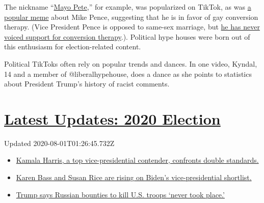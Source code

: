 The nickname
``\href{https://melmagazine.com/en-us/story/mayo-pete-memes-buttigieg-tiktok-teens}{Mayo
Pete},'' for example, was popularized on TikTok, as was
\href{https://melmagazine.com/en-us/story/camp-pence-tiktok-memes-lgbtq-conversion-therapy}{a
popular meme} about Mike Pence, suggesting that he is in favor of gay
conversion therapy. (Vice President Pence is opposed to same-sex
marriage, but
\href{https://www.nytimes.com/2016/11/30/us/politics/mike-pence-and-conversion-therapy-a-history.html}{he
has never voiced support for conversion therapy}.). Political hype
houses were born out of this enthusiasm for election-related content.

Political TikToks often rely on popular trends and dances. In one video,
Kyndal, 14 and a member of @liberalhypehouse, does a dance as she points
to statistics about President Trump's history of racist comments.

\hypertarget{latest-updates-2020-election}{%
\section{\texorpdfstring{\href{https://www.nytimes.com/2020/07/31/us/elections/biden-vs-trump.html?action=click\&pgtype=Article\&state=default\&region=MAIN_CONTENT_1\&context=storylines_live_updates}{Latest
Updates: 2020
Election}}{Latest Updates: 2020 Election}}\label{latest-updates-2020-election}}

Updated 2020-08-01T01:26:45.732Z

\begin{itemize}
\tightlist
\item
  \href{https://www.nytimes.com/2020/07/31/us/elections/biden-vs-trump.html?action=click\&pgtype=Article\&state=default\&region=MAIN_CONTENT_1\&context=storylines_live_updates\#link-29fdff45}{Kamala
  Harris, a top vice-presidential contender, confronts double
  standards.}
\item
  \href{https://www.nytimes.com/2020/07/31/us/elections/biden-vs-trump.html?action=click\&pgtype=Article\&state=default\&region=MAIN_CONTENT_1\&context=storylines_live_updates\#link-13ec3d9c}{Karen
  Bass and Susan Rice are rising on Biden's vice-presidential
  shortlist.}
\item
  \href{https://www.nytimes.com/2020/07/31/us/elections/biden-vs-trump.html?action=click\&pgtype=Article\&state=default\&region=MAIN_CONTENT_1\&context=storylines_live_updates\#link-49e9a016}{Trump
  says Russian bounties to kill U.S. troops `never took place.'}
\end{itemize}

